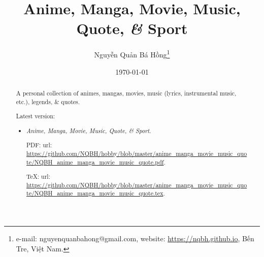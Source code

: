 \documentclass{article}
\title{Anime, Manga, Movie, Music, Quote, {\it\&} Sport}
\author{Nguyễn Quản Bá Hồng\footnote{e-mail: {\sf nguyenquanbahong@gmail.com}, website: \url{https://nqbh.github.io}, Bến Tre, Việt Nam.}}
\date{\today}
\begin{document}
\maketitle
\begin{abstract}
	A personal collection of animes, mangas, movies, music (lyrics, instrumental music, etc.), legends, \& quotes.

	Latest version:
	\begin{itemize}
		\item {\it Anime, Manga, Movie, Music, Quote, \& Sport}.

		PDF: {\sc url}: \url{https://github.com/NQBH/hobby/blob/master/anime_manga_movie_music_quote/NQBH_anime_manga_movie_music_quote.pdf}.

		\TeX: {\sc url}: \url{https://github.com/NQBH/hobby/blob/master/anime_manga_movie_music_quote/NQBH_anime_manga_movie_music_quote.tex}.
	\end{itemize}
\end{abstract}
\setcounter{secnumdepth}{4}
\setcounter{tocdepth}{4}
\tableofcontents

\end{document}
